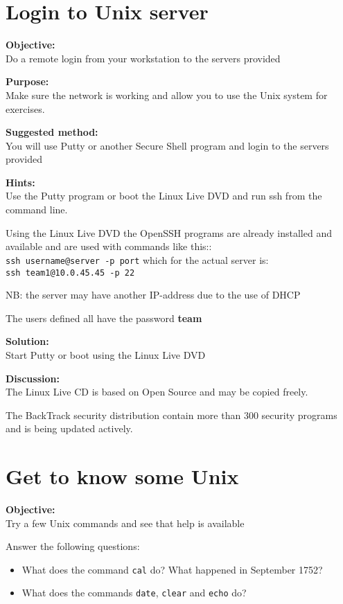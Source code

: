 \documentclass[a4paper,11pt,notitlepage]{report}
\begin{document}
\chapter{Login to Unix server}
\label{ex:unix-login}


{\bf Objective:}\\
Do a remote login from your workstation to the servers provided

{\bf Purpose:}\\
Make sure the network is working and allow you to use the Unix system for exercises.

{\bf Suggested method:}\\
You will use Putty or another Secure Shell program and login to the servers provided

{\bf Hints:}\\
Use the Putty program or boot the Linux Live DVD and run ssh from the command line.

Using the Linux Live DVD the OpenSSH programs are already installed and available
and are used with commands like this::\\
\verb+ssh username@server -p port+ which for the actual server is:\\
\verb+ssh team1@10.0.45.45 -p 22+

NB: the server may have another IP-address due to the use of DHCP

The users defined all have the password {\bf team}

{\bf Solution:}\\
Start Putty or boot using the Linux Live DVD

{\bf Discussion:}\\
The Linux Live CD is based on Open Source and may be copied freely.

The BackTrack security distribution contain more than 300 security programs and is being updated actively.


\chapter{Get to know some Unix}
\label{ex:unix-cal}

{\bf Objective:}\\
Try a few Unix commands and see that help is available

Answer the following questions:
\begin{itemize}
\item What does the command \verb+cal+ do? What happened in September 1752?
\item What does the commands \verb+date+, \verb+clear+ and \verb+echo+ do?
\end{itemize}
\end{document}
